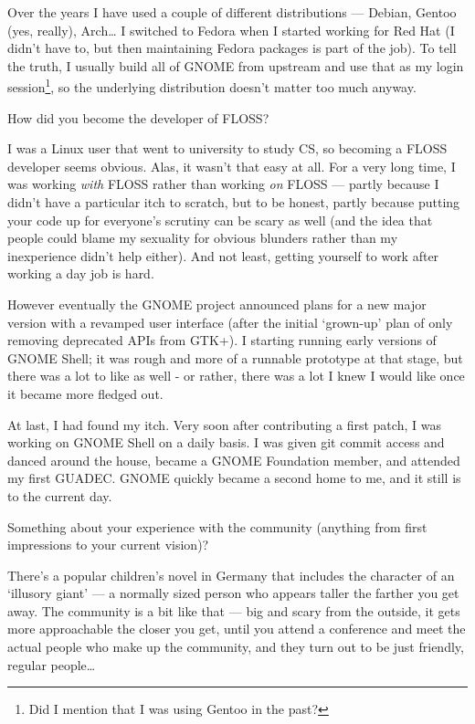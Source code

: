 \documentclass[10pt, a5paper]{article}
\begin{document}
\begin{Parallel}[p]{}{}
{Over the years I have used a couple of different distributions — Debian, Gentoo (yes, really), Arch… I switched to Fedora when I started working for Red Hat (I didn't have to, but then maintaining Fedora packages is part of the job). To tell the truth, I usually build all of GNOME from upstream and use that as my login session\footnote{Did I mention that I was using Gentoo in the past?}, so the underlying distribution doesn't matter too much anyway.




\q How did you become the developer of FLOSS?

\a I was a Linux user that went to university to study CS, so becoming a FLOSS developer seems obvious. Alas, it wasn't that easy at all. For a very long time, I was working \emph{with} FLOSS rather than working \emph{on} FLOSS — partly because I didn't have a particular itch to scratch, but to be honest, partly because putting your code up for everyone's scrutiny can be scary as well (and the idea that people could blame my sexuality for obvious blunders rather than my inexperience didn't help either). And not least, getting yourself to work after working a day job is hard.

However eventually the GNOME project announced plans for a new major version with a revamped user interface (after the initial ‘grown-up’ plan of only removing deprecated APIs from GTK+). I starting running early versions of GNOME  Shell; it was rough and more of a runnable prototype at that stage, but there was a lot to like as well - or rather, there was a lot I knew I would like once it became more fledged out.

At last, I had found my itch. Very soon after contributing a first patch, I was working on GNOME Shell on a daily basis. I was given git commit access and danced around the house, became a GNOME Foundation member, and attended my first GUADEC. GNOME quickly became a second home to me, and it still is to the current day.


\q Something about your experience with the community \linebreak(anything from first
impressions to your current vision)?

\a There's a popular children's novel in Germany that includes the character of an ‘illusory giant’ — a normally sized person who appears taller the farther you get away. The community is a bit like that — big and scary from the outside, it gets more approachable the closer you get, until you attend a conference and meet the actual people who make up the community, and they turn out to be just friendly, regular people…

}
\end{Parallel}
\end{document}
